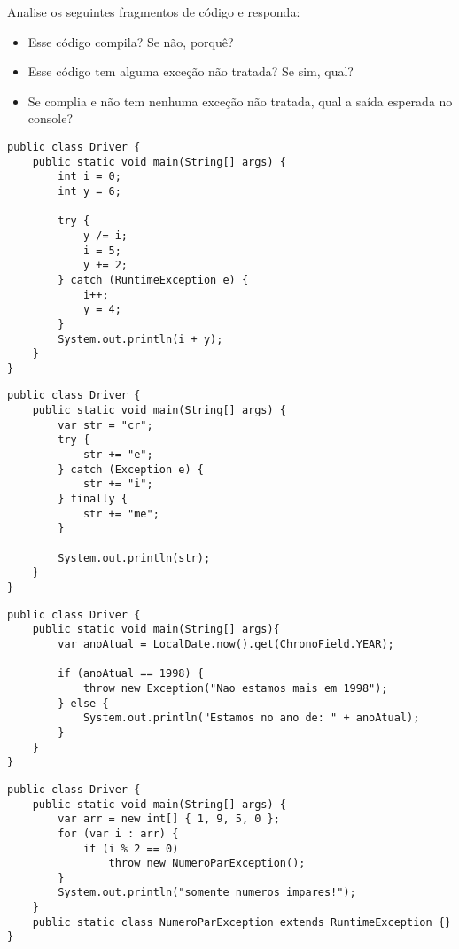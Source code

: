 \documentclass{lib/eng_softdoc}
\begin{document}
\makeheader

\problem Analise os seguintes fragmentos de código e responda: 
\begin{itemize}
        \item Esse código compila? Se não, porquê?
        \item Esse código tem alguma exceção não tratada? Se sim, qual?
        \item Se complia e não tem nenhuma exceção não tratada, qual a saída esperada no console?
\end{itemize}

\subproblem
\begin{lstlisting}
public class Driver {
	public static void main(String[] args) {
		int i = 0;
		int y = 6;

		try {
			y /= i;
			i = 5;
			y += 2;
		} catch (RuntimeException e) {
			i++;
			y = 4;
		}
		System.out.println(i + y);
	}
}
\end{lstlisting}


\vspace{0.25cm}
\subproblem
\begin{lstlisting}
public class Driver {
	public static void main(String[] args) {
		var str = "cr";
		try {
			str += "e";
		} catch (Exception e) {
			str += "i";
		} finally {
			str += "me";
		}

		System.out.println(str);
	}
}
\end{lstlisting}


\vspace{0.5cm}

\subproblem
\begin{lstlisting}
public class Driver {
	public static void main(String[] args){
		var anoAtual = LocalDate.now().get(ChronoField.YEAR);

		if (anoAtual == 1998) {
			throw new Exception("Nao estamos mais em 1998");
		} else {
			System.out.println("Estamos no ano de: " + anoAtual);
		}
	}
}
\end{lstlisting}
\vspace{0.5cm}

\subproblem
\begin{lstlisting}
public class Driver {
	public static void main(String[] args) {
		var arr = new int[] { 1, 9, 5, 0 };
		for (var i : arr) {
			if (i % 2 == 0)
				throw new NumeroParException();
		}
		System.out.println("somente numeros impares!");
	}
	public static class NumeroParException extends RuntimeException {}
}
\end{lstlisting}
\end{document}
